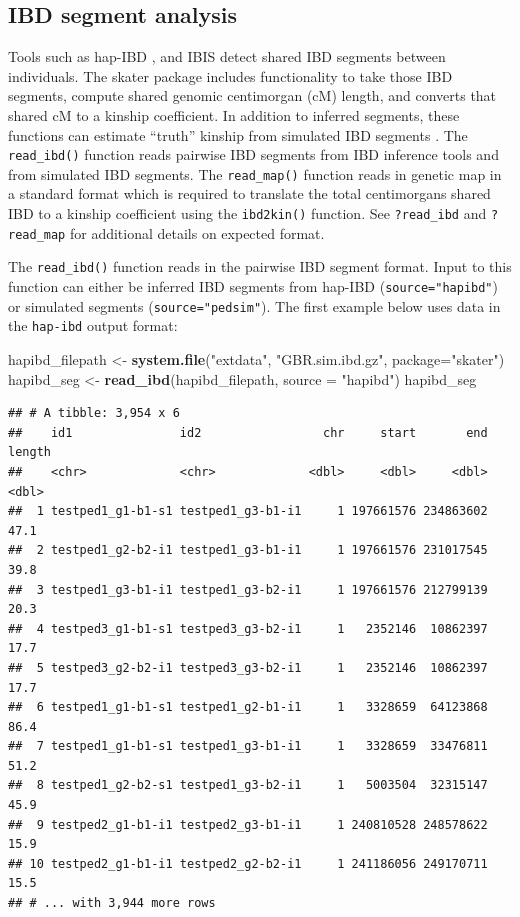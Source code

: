 \documentclass[9pt,a4paper,]{extarticle}
\newenvironment{Shaded}{\begin{snugshade}}{\end{snugshade}}
\newcommand{\DataTypeTok}[1]{\textcolor[rgb]{0.13,0.29,0.53}{#1}}
\newcommand{\KeywordTok}[1]{\textcolor[rgb]{0.13,0.29,0.53}{\textbf{#1}}}
\newcommand{\NormalTok}[1]{#1}
\newcommand{\StringTok}[1]{\textcolor[rgb]{0.31,0.60,0.02}{#1}}
\begin{document}
\hypertarget{ibd-segment-analysis}{%
\subsection{IBD segment analysis}\label{ibd-segment-analysis}}

Tools such as hap-IBD \citep{zhou2020}, and IBIS \citep{seidman2020} detect shared IBD segments between individuals. The skater package includes functionality to take those IBD segments, compute shared genomic centimorgan (cM) length, and converts that shared cM to a kinship coefficient. In addition to inferred segments, these functions can estimate ``truth'' kinship from simulated IBD segments \citep{caballero2019}. The \texttt{read\_ibd()} function reads pairwise IBD segments from IBD inference tools and from simulated IBD segments. The \texttt{read\_map()} function reads in genetic map in a standard format which is required to translate the total centimorgans shared IBD to a kinship coefficient using the \texttt{ibd2kin()} function. See \texttt{?read\_ibd} and \texttt{?read\_map} for additional details on expected format.

The \texttt{read\_ibd()} function reads in the pairwise IBD segment format. Input to this function can either be inferred IBD segments from hap-IBD (\texttt{source="hapibd"}) or simulated segments (\texttt{source="pedsim"}). The first example below uses data in the \texttt{hap-ibd} output format:

\begin{Shaded}
\begin{Highlighting}[]
\NormalTok{hapibd_filepath <-}\StringTok{ }\KeywordTok{system.file}\NormalTok{(}\StringTok{"extdata"}\NormalTok{, }\StringTok{"GBR.sim.ibd.gz"}\NormalTok{, }
                               \DataTypeTok{package=}\StringTok{"skater"}\NormalTok{)}
\NormalTok{hapibd_seg <-}\StringTok{ }\KeywordTok{read_ibd}\NormalTok{(hapibd_filepath, }\DataTypeTok{source =} \StringTok{"hapibd"}\NormalTok{)}
\NormalTok{hapibd_seg}
\end{Highlighting}
\end{Shaded}

\begin{verbatim}
## # A tibble: 3,954 x 6
##    id1               id2                 chr     start       end length
##    <chr>             <chr>             <dbl>     <dbl>     <dbl>  <dbl>
##  1 testped1_g1-b1-s1 testped1_g3-b1-i1     1 197661576 234863602   47.1
##  2 testped1_g2-b2-i1 testped1_g3-b1-i1     1 197661576 231017545   39.8
##  3 testped1_g3-b1-i1 testped1_g3-b2-i1     1 197661576 212799139   20.3
##  4 testped3_g1-b1-s1 testped3_g3-b2-i1     1   2352146  10862397   17.7
##  5 testped3_g2-b2-i1 testped3_g3-b2-i1     1   2352146  10862397   17.7
##  6 testped1_g1-b1-s1 testped1_g2-b1-i1     1   3328659  64123868   86.4
##  7 testped1_g1-b1-s1 testped1_g3-b1-i1     1   3328659  33476811   51.2
##  8 testped1_g2-b2-s1 testped1_g3-b2-i1     1   5003504  32315147   45.9
##  9 testped2_g1-b1-i1 testped2_g3-b1-i1     1 240810528 248578622   15.9
## 10 testped2_g1-b1-i1 testped2_g2-b2-i1     1 241186056 249170711   15.5
## # ... with 3,944 more rows
\end{verbatim}
\end{document}
